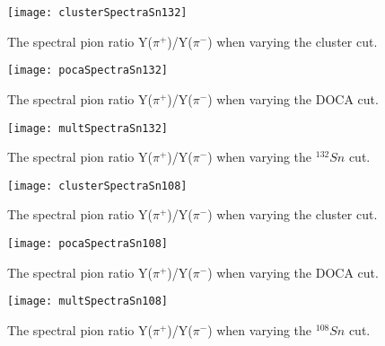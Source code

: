 \begin{figure}[!htb]
	\centering
    \texttt{[image: clusterSpectraSn132]}
	\caption{The spectral pion ratio Y($\pi^+$)/Y($\pi^-$) when varying the cluster cut.}
	\label{fig:clusterSpectralSn132}
\end{figure}


\begin{figure}[!htb]
	\centering
    \texttt{[image: pocaSpectraSn132]}
	\caption{The spectral pion ratio Y($\pi^+$)/Y($\pi^-$) when varying the DOCA cut.}
	\label{fig:docaSpectralSn132}
\end{figure}


\begin{figure}[!htb]
	\centering
    \texttt{[image: multSpectraSn132]}
	\caption{The spectral pion ratio Y($\pi^+$)/Y($\pi^-$) when varying the ${}^{132}Sn$ cut.}
	\label{fig:multSpectralSn132}
\end{figure}








\begin{figure}[!htb]
	\centering
    \texttt{[image: clusterSpectraSn108]}
	\caption{The spectral pion ratio Y($\pi^+$)/Y($\pi^-$) when varying the cluster cut.}
	\label{fig:clusterSpectralSn132}
\end{figure}


\begin{figure}[!htb]
	\centering
    \texttt{[image: pocaSpectraSn108]}
	\caption{The spectral pion ratio Y($\pi^+$)/Y($\pi^-$) when varying the DOCA cut.}
	\label{fig:docaSpectralSn132}
\end{figure}


\begin{figure}[!htb]
	\centering
    \texttt{[image: multSpectraSn108]}
	\caption{The spectral pion ratio Y($\pi^+$)/Y($\pi^-$) when varying the ${}^{108}Sn$ cut.}
	\label{fig:multSpectralSn132}
\end{figure}




